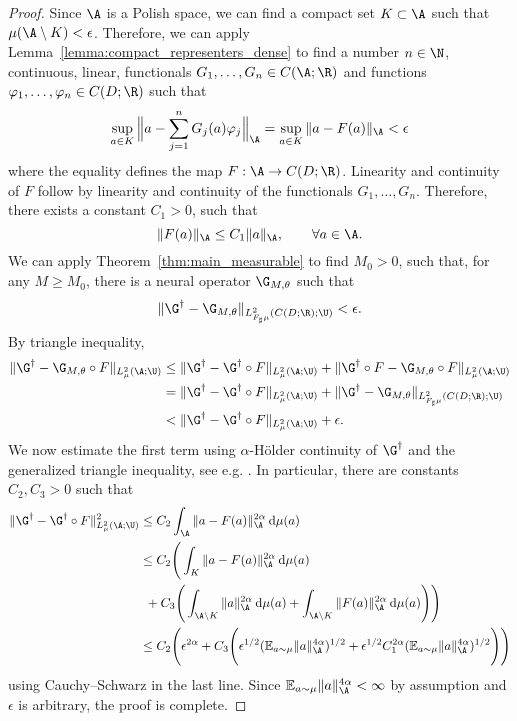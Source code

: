\begin{proof}
Since \(\A\) is a Polish space, we can find a compact set \(K \subset \A\) such that \(\mu(\A \setminus K) < \epsilon\). Therefore, we can apply Lemma~\ref{lemma:compact_representers_dense} to find a number \(n \in \N\), continuous, linear, functionals \(G_1,\dots,G_n \in C(\A;\R)\) and functions \(\varphi_1,\dots,\varphi_n \in C(D;\R)\) such that 
\[\sup_{a \in K} \Big\|a - \sum_{j=1}^n G_j(a) \varphi_j \Big\|_{\A}  = \sup_{a \in K} \|a - F(a) \|_{\A} < \epsilon\]
where the equality defines the map \(F : \A \to C(D;\R)\). Linearity and continuity of \(F\) follow by linearity and continuity of the functionals \(G_1,\dots,G_n\). Therefore, there exists a constant \(C_1 > 0\), such that
\[\|F(a)\|_{\A} \leq C_1 \|a\|_{\A}, \qquad \forall a \in \A.\]
We can apply Theorem~\ref{thm:main_measurable}
to find \(M_0 > 0\), such that, for any \(M \geq M_0\), there is a neural operator \(\G_{M,\theta}\) such that
\[\|\G^\dagger - \G_{M,\theta}\|_{L^2_{F_\sharp \mu}(C(D;\R);\U)} < \epsilon.\]
By triangle inequality,
\begin{align*}
    \|\G^\dagger - \G_{M,\theta} \circ F \|_{L^2_\mu(\A;\U)} &\leq \|\G^\dagger - \G^\dagger \circ F \|_{L^2_\mu(\A;\U)} + \|\G^\dagger \circ F - \G_{M,\theta} \circ F \|_{L^2_\mu(\A;\U)}  \\
    &= \|\G^\dagger - \G^\dagger \circ F \|_{L^2_\mu(\A;\U)} + \|\G^\dagger - \G_{M,\theta} \|_{L^2_{F_\sharp\mu}(C(D;\R);\U)} \\
    &< \|\G^\dagger - \G^\dagger \circ F \|_{L^2_\mu(\A;\U)} + \epsilon.
\end{align*}
We now estimate the first term using \(\alpha\)-H{\"o}lder continuity of \(\G^\dagger\) and the generalized triangle inequality, see e.g. \cite{didipour2012haracterization}. In particular, there are constants \(C_2, C_3 > 0\) such that
\begin{align*}
    \|\G^\dagger - \G^\dagger \circ F \|_{L^2_\mu(\A;\U)}^2 &\leq C_2 \int_\A \|a - F(a)\|_\A^{2\alpha} \: \text{d} \mu(a) \\
    &\leq C_2 \Bigg (\int_K \|a - F(a)\|_\A^{2\alpha} \: \text{d} \mu(a) \\
    &\:\:+ C_3 \Bigg ( \int_{\A \setminus K} \|a\|_\A^{2\alpha} \: \text{d}\mu(a) + \int_{\A \setminus K} \|F(a)\|_\A^{2\alpha} \: \text{d}\mu(a) \Bigg ) \Bigg ) \\
    &\leq C_2 \Bigg (\epsilon^{2\alpha} + C_3 \Bigg ( \epsilon^{1/2} (\mathbb{E}_{a \sim \mu} \|a\|_\A^{4\alpha})^{1/2} + \epsilon^{1/2} C_1^{2\alpha} (\mathbb{E}_{a \sim \mu} \|a\|_\A^{4\alpha})^{1/2} \Bigg) \Bigg)
\end{align*}
using Cauchy–Schwarz in the last line. Since \(\mathbb{E}_{a \sim \mu} \|a\|_\A^{4\alpha} < \infty\) by assumption and \(\epsilon\) is arbitrary, the proof is complete.
\end{proof}

